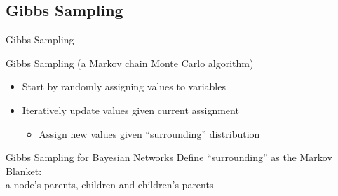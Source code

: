 \documentclass[12pt]{beamer}
\newcommand{\tab}{\hspace{1em}}
\begin{document}
\subsection{Gibbs Sampling}
\begin{frame}{Gibbs Sampling}
	\begin{block}{Gibbs Sampling (a Markov chain Monte Carlo algorithm)}
		\begin{itemize}
			\item Start by randomly assigning values to variables
			\item Iteratively update values given current assignment
				\begin{itemize}
					\item Assign new values given ``surrounding'' distribution
				\end{itemize}
		\end{itemize}
	\end{block}
	\pause
	\begin{block}{Gibbs Sampling for Bayesian Networks}
		Define ``surrounding'' as the \alert{Markov Blanket}: \\
		\tab\tab a node's parents, children and children's parents
	\end{block}
\end{frame}
\end{document}
